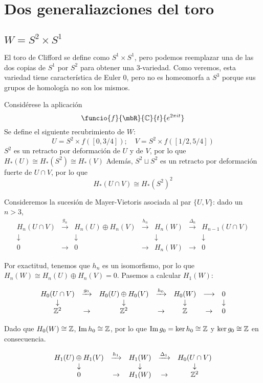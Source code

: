 \chapter{Dos generaliazciones del toro}
\section{$W=S^2\times S^1$}
El toro de Clifford se define como $S^1\times S^1$, pero podemos reemplazar una de las dos copias de $S^1$ por $S^2$ para obtener una 3-variedad.
Como veremos, esta variedad tiene característica de Euler 0, pero no es homeomorfa a $S^3$ porque sus grupos de homología no son los mismos.

Considérese la aplicación
\[\funcio{f}{\mbR}{\mb{C}}{t}{e^{2\pi i t}}\] Se define el siguiente recubrimiento de $W$: \[U=S^2\times f([0,3/4]); \quad V=S^2 \times f([1/2,5/4])\] $S^2$ es un retracto por deformación de $U$ y de $V$, por lo que $H_*(U)\cong H_*(S^2)\cong H_*(V)$ Además, $S^2\sqcup S^2$ es un retracto por deformación fuerte de $U\cap V$, por lo que $$H_*(U\cap V)\cong H_*(S^2)^2$$

Consideremos la sucesión de Mayer-Vietoris asociada al par $\{U,V\}$: dado un $n > 3$,
\[\begin{array}{ccccccc}
H_n(U\cap V)&\xrightarrow{g_n}&H_n(U)\oplus H_n(V)	&\xrightarrow{h_n}	&H_n(W)		&\xrightarrow{\Delta_n}&H_{n-1}(U \cap V)\\
\downarrow&&\downarrow			&					&\downarrow	&					&\downarrow\\
0& \rightarrow&0			&\rightarrow			&H_n(W)		&\rightarrow			&0
\end{array}\]

Por exactitud, tenemos que $h_n$ es un isomorfismo, por lo que $H_n(W) \cong H_n(U)\oplus H_n(V)=0$. Pasemos a calcular $H_1(W)$:

\[\begin{array}{ccccccc}
H_0(U\cap V)&\xrightarrow{g_0}&H_0(U)\oplus H_0(V)	&\xrightarrow{h_0}	&H_0(W)&\longrightarrow &0\\
\downarrow&					&\downarrow			&					&\downarrow & &\downarrow\\
\mathbb{Z}^2& \rightarrow&\mathbb{Z}^2			&\rightarrow			&\mathbb{Z} & \rightarrow & 0		
\end{array}\]

Dado que $H_0(W)\cong \mathbb{Z}$, $\operatorname{Im} h_0\cong \mathbb{Z}$, por lo que $\operatorname{Im} g_0=\ker h_0\cong \mathbb{Z}$ y $\ker g_0\cong \mathbb{Z}$ en consecuencia. 

\[\begin{array}{ccccccc}
H_1(U)\oplus H_1(V)	&\xrightarrow{h_1}	&H_1(W)		&\xrightarrow{\Delta_1}&H_0(U \cap V)\\
\downarrow			&					&\downarrow	&					&\downarrow\\
0			&\rightarrow			&H_1(W)		&\rightarrow			&\mathbb{Z}^2
\end{array}\]


